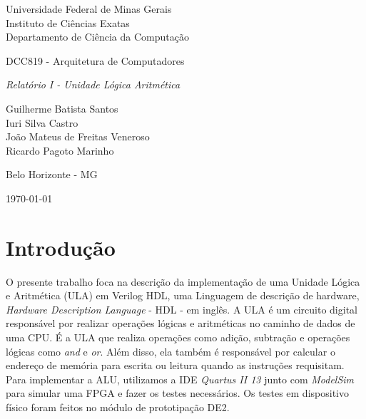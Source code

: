 \documentclass[11pt,a4paper,titlepage]{article}
\newcommand{\titulo}{\textit{Relatório I - Unidade Lógica Aritmética}}
\begin{document}
\begin{titlepage}
\begin{center}

\begin{large}
Universidade Federal de Minas Gerais\\
Instituto de Ciências Exatas\\
Departamento de Ciência da Computação\\
\end{large}

\vspace{20mm}

\begin{Large}
DCC819 - Arquitetura de Computadores
\end{Large}

\vspace{20mm}

\begin{LARGE}
\titulo
\end{LARGE}


\vspace{30mm}

\begin{Large}
\begin{center}
Guilherme Batista Santos\\ Iuri Silva Castro\\ João Mateus de Freitas Veneroso\\ Ricardo Pagoto Marinho \\
\end{center}
\end{Large}


\vspace{60mm}

{\sc Belo Horizonte - MG}

{\sc \today}

\end{center}
\end{titlepage}


\section{Introdução}\label{sec:intro}

O presente trabalho foca na descrição da implementação de uma Unidade Lógica e Aritmética (ULA) em Verilog HDL, uma Linguagem de descrição de hardware, \textit{Hardware Description Language} - HDL - em inglês.
A ULA é um circuito digital responsável por realizar operações lógicas e aritméticas no caminho de dados de uma CPU.
É a ULA que realiza operações como adição, subtração e operações lógicas como \textit{and} e \textit{or}.
Além disso, ela também é responsável por calcular o endereço de memória para escrita ou leitura quando as instruções requisitam.
Para implementar a ALU, utilizamos a IDE \textit{Quartus II 13} junto com \textit{ModelSim} para simular uma FPGA e fazer os testes necessários.
Os testes em dispositivo físico foram feitos no módulo de prototipação DE2.
\end{document}
